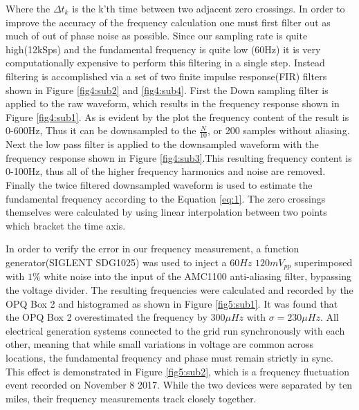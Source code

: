 Where the $\Delta t_{k}$ is the k'th time between two adjacent zero crossings. In order to improve the accuracy of the frequency calculation one must first filter out as much of out of phase noise as possible. Since our sampling rate is quite high(12kSps) and the fundamental frequency is quite low (60Hz) it is very computationally expensive to perform this filtering in a single step. Instead filtering is accomplished via a set of two finite impulse response(FIR) filters shown in Figure \ref{fig4:sub2} and \ref{fig4:sub4}. First the Down sampling filter is applied to the raw waveform, which results in the frequency response shown in Figure \ref{fig4:sub1}. As is evident by the plot the frequency content of the result is 0-600Hz, Thus it can be downsampled to the $\frac{N}{10}$, or 200 samples without aliasing. Next the low pass filter is applied to the downsampled waveform with the frequency response shown in Figure \ref{fig4:sub3}.This resulting frequency content is 0-100Hz, thus all of the higher frequency harmonics and noise are removed. Finally the twice filtered downsampled waveform is used to estimate the fundamental frequency according to the Equation \ref{eq:1}. The zero crossings themselves were calculated by using linear interpolation between two points which bracket the time axis.

In order to verify the error in our frequency measurement, a function generator(SIGLENT SDG1025) was used to inject a $60Hz$ $120mV_{pp}$ superimposed with $1\%$ white noise into the input of the AMC1100 anti-aliasing filter, bypassing the voltage divider. The resulting frequencies were calculated and recorded by the OPQ Box 2 and histogramed as shown in Figure \ref{fig5:sub1}. It was found that the OPQ Box 2 overestimated the frequency by $300\mu Hz$ with $\sigma  = 230\mu Hz$. All electrical generation systems connected to the grid run synchronously with each other, meaning that while small variations in voltage are common across locations, the fundamental frequency and phase must remain strictly in sync. This effect is demonstrated in Figure \ref{fig5:sub2}, which is a frequency fluctuation event recorded on November 8 2017. While the two devices were separated by ten miles, their frequency measurements track closely together.


